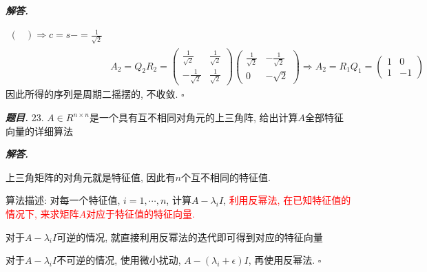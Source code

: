 \documentclass[10pt, a4paper, oneside]{ctexart}
\newenvironment{problem}{\begin{framed}\par\noindent\textbf{\textit{题目. }}}{\end{framed}\par}
\newenvironment{solution}{%
  \par\noindent\textbf{\textit{解答. }}\ignorespaces
}{%
  \hfill\ensuremath{\square}\par %
}
\begin{document}
\begin{solution}
\begin{align*}
\begin{pmatrix}
        \end{pmatrix}\Rightarrow c=s-=\frac{1}{\sqrt{2}}\\
        &A_2=Q_2R_2=\begin{pmatrix}
            \frac{1}{\sqrt{2}}&\frac{1}{\sqrt{2}}\\
            -\frac{1}{\sqrt{2}}&\frac{1}{\sqrt{2}}
        \end{pmatrix}\begin{pmatrix}
            \frac{1}{\sqrt{2}}&-\frac{1}{\sqrt{2}}\\
            0&-\sqrt{2}
        \end{pmatrix}\Rightarrow A_2=R_1Q_1=\begin{pmatrix}
            1&0\\1&-1
        \end{pmatrix} 
    \end{align*}
    因此所得的序列是周期二摇摆的, 不收敛.
    \end{solution}
    
    \begin{problem}
        23. $A\in R^{n\times n}$是一个具有互不相同对角元的上三角阵, 给出计算$A$全部特征向量的详细算法 
    \end{problem}
    \begin{solution}
        上三角矩阵的对角元就是特征值, 因此有$n$个互不相同的特征值.
    
        算法描述: 对每一个特征值, $i=1,\cdots,n$, 计算$A-\lambda_i I$, \textcolor{red}{利用反幂法, 在已知特征值的情况下, 来求矩阵$A$对应于特征值的特征向量.}
    
        对于$A-\lambda_i I$可逆的情况, 就直接利用反幂法的迭代即可得到对应的特征向量
    
        对于$A-\lambda_i I$不可逆的情况, 使用微小扰动, $A-(\lambda_i+\epsilon) I$, 再使用反幂法.
    \end{solution}
\end{document}
